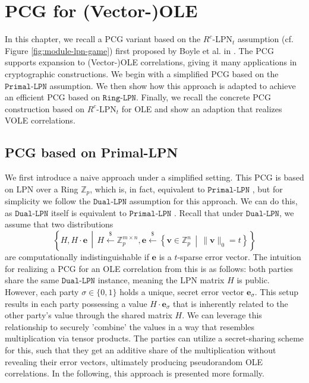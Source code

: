 \chapter{PCG for (Vector-)OLE}
In this chapter, we recall a PCG variant based on the $R^{c}$-LPN$_{t}$ assumption (cf. Figure \ref{fig:module-lpn-game}) first proposed by Boyle et al. in \cite{boyle2020efficient}. The PCG supports expansion to (Vector-)OLE correlations, giving it many applications in cryptographic constructions. We begin with a simplified PCG based on the $\texttt{Primal-LPN}$ assumption. We then show how this approach is adapted to achieve an efficient PCG based on $\texttt{Ring-LPN}$. Finally, we recall the concrete PCG construction based on $R^{c}$-LPN$_{t}$ for OLE \cite{boyle2020efficient} and show an adaption that realizes VOLE correlations.

\section{PCG based on Primal-LPN}
\label{sec:naivePCG}
We first introduce a naive approach under a simplified setting. This PCG is based on LPN over a Ring $\mathbb{Z}_p$, which is, in fact, equivalent to $\texttt{Primal-LPN}$ \cite{blum1993cryptographic}, but for simplicity we follow the $\texttt{Dual-LPN}$ assumption for this approach. We can do this, as $\texttt{Dual-LPN}$ itself is equivalent to $\texttt{Primal-LPN}$ \cite{couteau2021silver}. Recall that under $\texttt{Dual-LPN}$, we assume that two distributions
$$
\left\{ H, H \cdot \mathbf{e} \,\middle|\, H \stackrel{\$}{\leftarrow} \mathbb{Z}_p^{m \times n}, \mathbf{e} \stackrel{\$}{\leftarrow} \left\{ \mathbf{v} \in \mathbb{Z}_p^n \,\middle|\, \|\mathbf{v}\|_0 = t \right\} \right\}
$$
are computationally indistinguishable if $\mathbf{e}$ is a $t$-sparse error vector. The intuition for realizing a PCG for an OLE correlation from this is as follows: both parties share the same $\texttt{Dual-LPN}$ instance, meaning the LPN matrix $H$ is public. However, each party $\sigma \in\{0,1\}$ holds a unique, secret error vector $\mathbf{e}_\sigma$. This setup results in each party possessing a value $H\cdot \mathbf{e}_\sigma$ that is inherently related to the other party's value through the shared matrix $H$. We can leverage this relationship to securely ’combine’ the values in a way that resembles multiplication via tensor products. The parties can utilize a secret-sharing scheme for this, such that they get an additive share of the multiplication without revealing their error vectors, ultimately producing pseudorandom OLE correlations. In the following, this approach is presented more formally.

